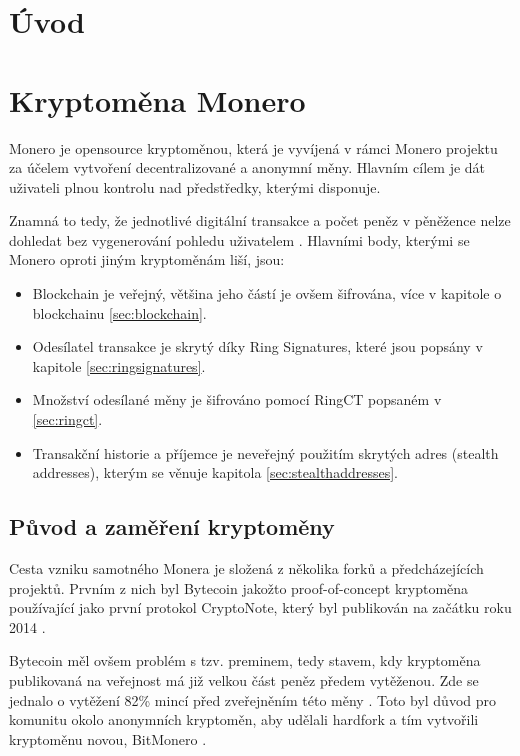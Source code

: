 \documentclass[
  printed, %
  table,   %
  nolof,     %
  nolot,     %
           oneside, color
]{fithesis3}
\begin{document}
\chapter{Úvod}
\chapter{Kryptoměna Monero}
Monero je opensource kryptoměnou, která je vyvíjená v rámci Monero projektu za účelem vytvoření decentralizované a anonymní měny. Hlavním cílem je dát uživateli plnou kontrolu nad předstředky, kterými disponuje. 

Znamná to tedy, že jednotlivé digitální transakce a počet peněz v pěněžence nelze dohledat bez vygenerování pohledu uživatelem \cite{moneroprojectgithub}. Hlavními body, kterými se Monero oproti jiným kryptoměnám liší, jsou:
\begin{itemize}\itemsep0em
\item Blockchain je veřejný, většina jeho částí je ovšem šifrována, více v kapitole o blockchainu \ref{sec:blockchain}.
\item Odesílatel transakce je skrytý díky Ring Signatures, které jsou popsány v kapitole \ref{sec:ringsignatures}.
\item Množství odesílané měny je šifrováno pomocí RingCT popsaném v \ref{sec:ringct}.
\item Transakční historie a příjemce je neveřejný použitím skrytých adres (stealth addresses), kterým se věnuje kapitola \ref{sec:stealthaddresses}.
\end{itemize}
\section{Původ a zaměření kryptoměny}
Cesta vzniku samotného Monera je složená z několika forků a předcházejících projektů. Prvním z nich byl Bytecoin jakožto proof-of-concept kryptoměna používající jako první protokol CryptoNote, který byl publikován na začátku roku 2014 \cite{githubbytecoin}.

Bytecoin měl ovšem problém s tzv. preminem, tedy stavem, kdy kryptoměna publikovaná na veřejnost má již velkou část peněz předem vytěženou. Zde se jednalo o vytěžení 82\% mincí před zveřejněním této měny \cite{fluffyponyonbytecoin}.
Toto byl důvod pro komunitu okolo anonymních kryptoměn, aby udělali hardfork a tím vytvořili kryptoměnu novou, BitMonero \cite{bitmonero}.
\end{document}
